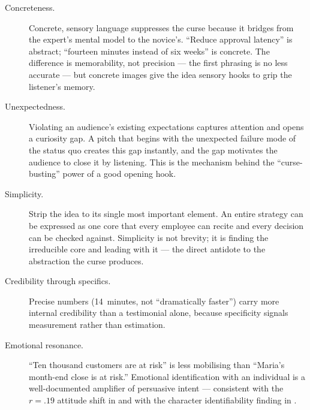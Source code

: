 \begin{description}
  \item[Concreteness.] Concrete, sensory language suppresses the curse because it bridges
    from the expert's mental model to the novice's. ``Reduce approval latency'' is
    abstract; ``fourteen minutes instead of six weeks'' is concrete. The difference is
    memorability, not precision — the first phrasing is no less accurate — but concrete
    images give the idea sensory hooks to grip the listener's memory.

  \item[Unexpectedness.] Violating an audience's existing expectations captures attention
    and opens a curiosity gap. A pitch that begins with the unexpected failure mode of the
    status quo creates this gap instantly, and the gap motivates the audience to close it
    by listening. This is the mechanism behind the ``curse-busting'' power of a good
    opening hook.

  \item[Simplicity.] Strip the idea to its single most important element. An entire
    strategy can be expressed as one core that every employee can recite and every decision
    can be checked against. Simplicity is not brevity; it is finding the irreducible core
    and leading with it — the direct antidote to the abstraction the curse produces.

  \item[Credibility through specifics.] Precise numbers (\num{14}~minutes, not
    ``dramatically faster'') carry more internal credibility than a testimonial alone,
    because specificity signals measurement rather than estimation.

  \item[Emotional resonance.] ``Ten thousand customers are at risk'' is less mobilising
    than ``Maria's month-end close is at risk.'' Emotional identification with an
    individual is a well-documented amplifier of persuasive intent — consistent with the
    \(r = .19\) attitude shift in \textcite{braddock2016narrative} and with the character
    identifiability finding in \textcite{vanlaer2014extended}. %
\end{description}

